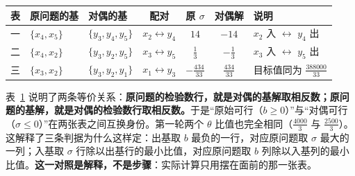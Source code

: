 \begin{table}[!htbp]\centering
\small
\begin{tabular}{@{}lll|cccl@{}}
\toprule
\rowcolor{lightblue}表 & 原问题的基 & 对偶的基 & 配对 & 原 $\sigma$ & 对偶解 & 说明\\\midrule
一 & $\{x_4,x_5\}$ & $\{y_3,y_4,y_5\}$ & $x_2\leftrightarrow y_4$ & $14$ & $-14$ & $x_2$ 入 $\leftrightarrow$ $y_4$ 出\\
二 & $\{x_4,x_2\}$ & $\{y_3,y_2,y_5\}$ & $x_3\leftrightarrow y_5$ & $\frac13$ & $-\frac13$ & $x_3$ 入 $\leftrightarrow$ $y_5$ 出\\
三 & $\{x_3,x_2\}$ & $\{y_3,y_2,y_1\}$ & $x_1\leftrightarrow y_3$ & $-\frac{434}{33}$ & $\frac{434}{33}$ & 目标值同为 $\frac{388000}{33}$\\\bottomrule
\end{tabular}\par\nopagebreak[4]
\label{tab:pair}
\end{table}

表~\ref{tab:pair} 说明了两条等价关系：\textbf{原问题的检验数行，就是对偶的基解取相反数；原问题的基解，就是对偶的检验数行取相反数。}于是“原始可行（$b\ge0$）”与“对偶可行（$\sigma\le0$）”在两张表之间互换身份。第一轮两个 $\theta$ 比值也完全相同（$\frac{4000}{3}$ 与 $\frac{2500}{3}$）。这解释了三条判据为什么这样定：出基取 $b$ 最负的一行，对应原问题取 $\sigma$ 最大的一列；入基取 $\sigma$ 行除以出基行的最小比值，对应原问题取 $b$ 列除以入基列的最小比值。\textbf{这一对照是解释，不是步骤}：实际计算只用摆在面前的那一张表。

